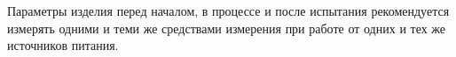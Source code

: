 Параметры изделия перед началом, в процессе и после испытания рекомендуется измерять одними и теми же средствами измерения  при работе от одних и тех же источников питания.